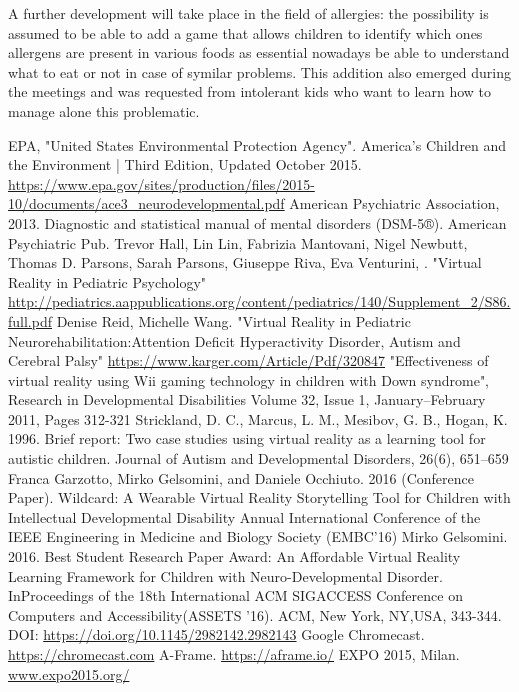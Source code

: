 \documentclass{sigchi-ext}
\begin{document}
A further development will take place in the field of allergies: the possibility is assumed to be able to add a game that allows children to identify which ones allergens are present in various foods as essential nowadays be able to understand what to eat or not in case of symilar problems. This addition also emerged during the meetings and was requested from intolerant kids who want to learn how to manage alone this problematic.

\renewcommand\refname{ciao}
\begin{thebibliography}{100}
 EPA, "United States Environmental Protection Agency". America's Children and the Environment | Third Edition, Updated October 2015. 
\url{https://www.epa.gov/sites/production/files/2015-10/documents/ace3_neurodevelopmental.pdf}
 American Psychiatric Association, 2013. Diagnostic and statistical manual of mental disorders (DSM-5®). American Psychiatric Pub. 
 Trevor Hall, Lin Lin, Fabrizia Mantovani, Nigel Newbutt, Thomas D. Parsons, Sarah Parsons, Giuseppe Riva, Eva Venturini, . "Virtual Reality in Pediatric Psychology"
\url{http://pediatrics.aappublications.org/content/pediatrics/140/Supplement_2/S86.full.pdf}
 Denise Reid, Michelle Wang. "Virtual Reality in Pediatric Neurorehabilitation:Attention Deficit Hyperactivity Disorder, Autism and Cerebral Palsy"
\url{https://www.karger.com/Article/Pdf/320847} 
 "Effectiveness of virtual reality using Wii gaming technology in children with Down syndrome", Research in Developmental Disabilities Volume 32, Issue 1, January–February 2011, Pages 312-321
 Strickland, D. C., Marcus, L. M., Mesibov, G. B., Hogan, K. 1996. Brief report: Two case studies using virtual reality as a learning tool for autistic children. Journal of Autism and Developmental Disorders, 26(6), 651–659
 Franca Garzotto, Mirko Gelsomini, and Daniele Occhiuto. 2016 (Conference Paper). Wildcard: A Wearable Virtual Reality Storytelling Tool for Children with Intellectual Developmental Disability Annual International Conference of the IEEE Engineering in Medicine and Biology Society (EMBC’16)
 Mirko Gelsomini. 2016. Best Student Research Paper Award: An Affordable Virtual Reality Learning Framework for Children with Neuro-Developmental Disorder. InProceedings of the 18th International ACM SIGACCESS Conference on Computers and Accessibility(ASSETS '16). ACM, New York, NY,USA, 343-344. DOI: \url{https://doi.org/10.1145/2982142.2982143}
 Google Chromecast. \url{https://chromecast.com}
 A-Frame. \url{https://aframe.io/}
 EXPO 2015, Milan. \url{www.expo2015.org/}
\end{thebibliography}

\balance{} 

%
\end{document}
